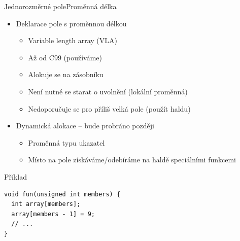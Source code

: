 \begin{frame}[fragile]{Jednorozměrné pole}{Proměnná délka}

  \begin{itemize}
    \item Deklarace pole s proměnnou délkou
    \begin{itemize}
      \item Variable length array (VLA)
      \item Až od C99 (používáme)

      \pause

      \item Alokuje se na zásobníku
      \item Není nutné se starat o uvolnění (lokální proměnná)
      \item Nedoporučuje se pro příliš velká pole (použít haldu)
    \end{itemize}

    \pause

    \item Dynamická alokace -- bude probráno později
    \begin{itemize}
      \item Proměnná typu ukazatel 
      \item Místo na pole získáváme/odebíráme na haldě speciálními funkcemi
    \end{itemize}
  \end{itemize}


\begin{block}{Příklad}
\begin{lstlisting}
void fun(unsigned int members) {
  int array[members];
  array[members - 1] = 9;
  // ...
}
\end{lstlisting} %
\end{block}

\end{frame}

